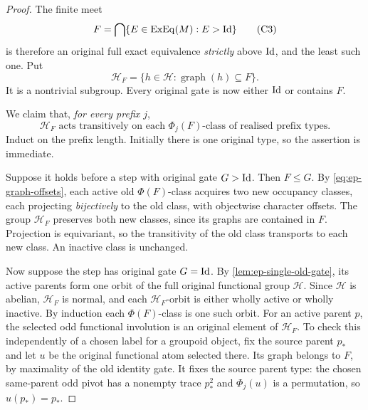 \begin{proof}
The finite meet
\[
 F=\bigcap\{E\in\operatorname{ExEq}(M):
                                      E>\mathrm{Id}\}
 \tag{C3}\label{eq:ep-least-F}
\]
is therefore an original full exact equivalence
\emph{strictly} above \(\mathrm{Id}\), and the least
such one. Put
\[
 \mathscr H_F=
    \{h\in\mathscr H:\operatorname{graph}(h)\subseteq F\}.
 \tag{C4}\label{eq:ep-HF}
\]
It is a nontrivial subgroup.
Every original gate is now either \(\mathrm{Id}\) or
contains \(F\).

We claim that, \emph{for every prefix \(j\)},
\[
 \mathscr H_F\text{ acts transitively on each }
     \Phi_j(F)\text{-class of realised prefix types}.
 \tag{C5}\label{eq:ep-HF-transitive}
\]
Induct on the prefix length. Initially there is
one original type, so the assertion is immediate.

Suppose it holds before a step with original
gate \(G>\mathrm{Id}\). Then \(F\le G\).
By \eqref{eq:ep-graph-offsets}, each active
old \(\Phi(F)\)-class acquires two new
occupancy classes, each projecting \emph{bijectively}
to the old class, with objectwise character offsets.
The group \(\mathscr H_F\) preserves both
new classes, since its graphs are contained in
\(F\). Projection is equivariant, so the
transitivity of the old class transports to
each new class. An inactive class is unchanged.

Now suppose the step has original gate \(G=\mathrm{Id}\).
By \cref{lem:ep-single-old-gate}, its active
parents form one orbit of the full original
functional group \(\mathscr H\).
Since \(\mathscr H\) is abelian,
\(\mathscr H_F\) is normal, and each
\(\mathscr H_F\)-orbit is either wholly active
or wholly inactive. By induction each
\(\Phi(F)\)-class is one such orbit.
For an active parent \(p\), the selected
odd functional involution is an original
element of \(\mathscr H_F\). To check
this independently of a chosen label
for a groupoid object, fix the source
parent \(p_*\) and let \(u\) be the
original functional atom selected there.
Its graph belongs to \(F\), by maximality
of the old identity gate. It fixes the
source parent type: the chosen
same-parent odd pivot has a nonempty
trace \(p_*^2\) and
\(\Phi_j(u)\) is a permutation, so
\(u(p_*)=p_*\).


\end{proof}
